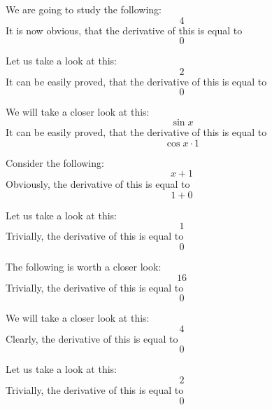 \documentclass{article}
\begin{document}
We are going to study the following:
\begin{equation}
4 
\end{equation}
It is now obvious, that the derivative of this is equal to
\begin{equation}
0 
\end{equation}

Let us take a look at this:
\begin{equation}
2 
\end{equation}
It can be easily proved, that the derivative of this is equal to
\begin{equation}
0 
\end{equation}

We will take a closer look at this:
\begin{equation}
\sin x 
\end{equation}
It can be easily proved, that the derivative of this is equal to
\begin{equation}
\cos x \cdot 1 
\end{equation}

Consider the following:
\begin{equation}
x + 1 
\end{equation}
Obviously, the derivative of this is equal to
\begin{equation}
1 + 0 
\end{equation}

Let us take a look at this:
\begin{equation}
1 
\end{equation}
Trivially, the derivative of this is equal to
\begin{equation}
0 
\end{equation}

The following is worth a closer look:
\begin{equation}
16 
\end{equation}
Trivially, the derivative of this is equal to
\begin{equation}
0 
\end{equation}

We will take a closer look at this:
\begin{equation}
4 
\end{equation}
Clearly, the derivative of this is equal to
\begin{equation}
0 
\end{equation}

Let us take a look at this:
\begin{equation}
2 
\end{equation}
Trivially, the derivative of this is equal to
\begin{equation}
0 
\end{equation}
\end{document}
